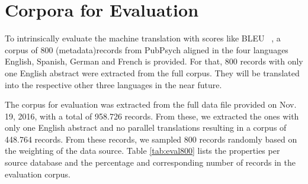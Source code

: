 \documentclass[a4paper,11pt]{article}
\begin{document}
%  

\section{Corpora for Evaluation}
\label{s:evaluation}
To intrinsically evaluate the machine translation with scores like BLEU ~\cite{papineni_bleu:_2002}, a corpus of 800 (metadata)records from PubPsych aligned in the four languages English, Spanish, German and French is provided. For that, 800 records with only one English abstract were extracted from the full corpus. They will be translated into the respective other three languages in the near future.

The corpus for evaluation was extracted from the full data file provided on Nov. 19, 2016, with a total of 958.726 records. From these, we extracted the ones with only one English abstract and no parallel translations resulting in a corpus of 448.764 records. From these records, we sampled 800 records randomly based on the weighting of the data source. Table \ref{tab:eval800} lists the properties per source database and the percentage and corresponding number of records in the evaluation corpus.
\end{document}
